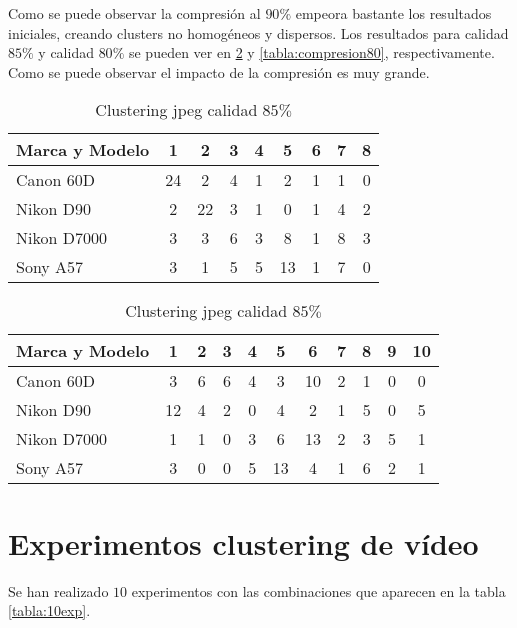 Como se puede observar la compresión al $90\%$ empeora bastante los resultados iniciales, creando clusters no homogéneos y dispersos. Los resultados para calidad $85\%$ y calidad $80\%$ se pueden ver en \ref{tabla:compresion85} y \ref{tabla:compresion80}, respectivamente. Como se puede observar el impacto de la compresión es muy grande.

\begin{table}[!htb]
    \centering
        \begin{tabular}{|l|c|c|c|c|c|c|c|c|}
        \hline
        \rowcolor[gray]{0.9}
        \textbf{Marca y Modelo} & 1 & 2 & 3 & 4 & 5 & 6 & 7 & 8 \\ \hline
        Canon 60D & 24 & 2 & 4 & 1 & 2 & 1 & 1 & 0 \\ \hline
        Nikon D90 & 2 & 22 & 3 & 1 & 0 & 1 & 4 & 2 \\ \hline
        Nikon D7000 & 3 & 3 & 6 & 3 & 8 & 1 & 8 & 3 \\ \hline
        Sony A57 & 3 & 1 & 5 & 5 & 13 & 1 & 7 & 0 \\ \hline
        \end{tabular}
    \caption{Clustering jpeg calidad $85\%$}
    \label{tabla:compresion85}
\end{table}

\begin{table}[!htb]
    \centering
        \begin{tabular}{|l|c|c|c|c|c|c|c|c|c|c|}
        \hline
        \rowcolor[gray]{0.9}
        \textbf{Marca y Modelo} & 1 & 2 & 3 & 4 & 5 & 6 & 7 & 8 & 9 & 10\\ \hline
        Canon 60D & 3 & 6 & 6 & 4 & 3 & 10 & 2 & 1 & 0 & 0 \\ \hline
        Nikon D90 & 12 & 4 & 2 & 0 & 4 & 2 & 1 & 5 & 0 & 5 \\ \hline
        Nikon D7000 & 1 & 1 & 0 & 3 & 6 & 13 & 2 & 3 & 5 & 1 \\ \hline
        Sony A57 & 3 & 0 & 0 & 5 & 13 & 4 & 1 & 6 & 2 & 1 \\ \hline
        \end{tabular}
    \caption{Clustering jpeg calidad $85\%$}
    \label{tabla:compresion85}
\end{table}

\section{Experimentos clustering de vídeo}

Se han realizado $10$ experimentos con las combinaciones que aparecen en la tabla \ref{tabla:10exp}.

